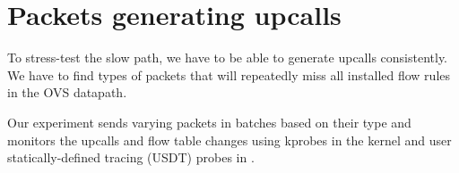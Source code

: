 %

\section{Packets generating upcalls}
\label{design:upcall-generators}

To stress-test the slow path, we have to be able to generate upcalls consistently. We have to find types of packets that will repeatedly miss all installed flow rules in the OVS datapath.

Our experiment sends varying packets in batches based on their type and monitors the upcalls and flow table changes using kprobes in the kernel and user statically-defined tracing (USDT) probes in .

